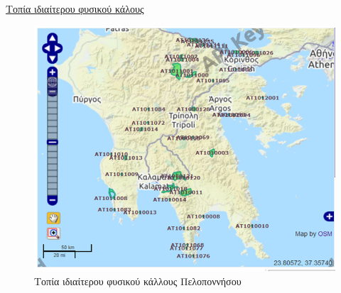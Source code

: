 \documentclass[12pt]{article}
\begin{document}
	\underline{Τοπία ιδιαίτερου φυσικού κάλους}
	
	\begin{figure} [H]
		\begin{center}
			\includegraphics [scale = 0.60] {kallos.png}
			\caption{Τοπία ιδιαίτερου φυσικού κάλλους Πελοποννήσου}
		\end{center}
	\end{figure}
\end{document}
